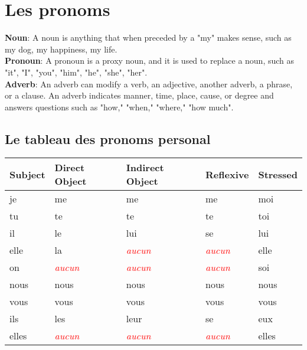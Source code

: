 \documentclass{microdoc} %
\newcommand\lAucun{\it{\textcolor{Red}{aucun}}}
\begin{document}
\section{Les pronoms} %
{\bf Noun}:
A noun is anything that when preceded by a "my" makes sense, such as my dog,
my happiness, my life.\\

{\bf Pronoun}:
A pronoun is a proxy noun, and it is used to replace a noun, such as "it",
"I", "you", "him", "he", "she", "her".\\

{\bf Adverb}:
An adverb can modify a verb, an adjective, another adverb, a phrase, or a
clause. An adverb indicates manner, time, place, cause, or degree and
answers questions such as "how," "when," "where," "how much".\\

\subsection{Le tableau des pronoms personal}
\begin{table}[H]
    \begin{tabular}{l l l l l}
        Subject & Direct Object      & Indirect Object    & Reflexive          & Stressed\\
        \hline
        je      & me\footnotemark[1] & me\footnotemark[1] & me\footnotemark[1] & moi\\
        tu      & te\footnotemark[1] & te\footnotemark[1] & te\footnotemark[1] & toi\\
        il      & le                 & lui                & se                 & lui\\
        elle    & la                 & \lAucun            & \lAucun            & elle\\
        on      & \lAucun            & \lAucun            & \lAucun            & soi\\
        nous    & nous               & nous               & nous               & nous\\
        vous    & vous               & vous               & vous               & vous\\
        ils     & les                & leur               & se                 & eux\\
        elles   & \lAucun            & \lAucun            & \lAucun            & elles\\
    \end{tabular}
\end{table}
\end{document}
